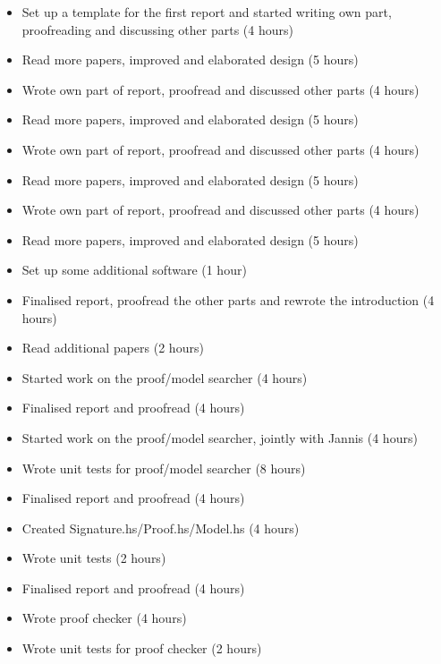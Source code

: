 %
{ \begin{itemize} 
    \item Set up a template for the first report and started writing own part,
proofreading and discussing other parts (4 hours)
    \item Read more papers, improved and elaborated design (5 hours)
 \end{itemize} 
}%
{ \begin{itemize} 
    \item Wrote own part of report, proofread and discussed other parts (4 hours)
    \item Read more papers, improved and elaborated design (5 hours)
 \end{itemize} 
}%
{ \begin{itemize} 
    \item Wrote own part of report, proofread and discussed other parts (4 hours)
    \item Read more papers, improved and elaborated design (5 hours)
 \end{itemize} 
}%
{ \begin{itemize} 
    \item Wrote own part of report, proofread and discussed other parts (4 hours)
    \item Read more papers, improved and elaborated design (5 hours)
    \item Set up some additional software (1 hour)
 \end{itemize} 
}%

%
{ \begin{itemize} 
  \item Finalised report, proofread the other
parts and rewrote the introduction  (4 hours)
 \item Read additional papers (2 hours)
 \item Started work on the proof/model searcher (4 hours)
 \end{itemize} 
}%
{ \begin{itemize} 
 \item Finalised report and proofread (4 hours)
 \item Started work on the proof/model searcher, jointly with Jannis (4 hours)
 \item Wrote unit tests for proof/model searcher (8 hours)
 \end{itemize} 
}%
{ \begin{itemize} 
  \item Finalised report and proofread (4 hours)
  \item Created Signature.hs/Proof.hs/Model.hs (4 hours)
  \item Wrote unit tests (2 hours)
 \end{itemize} 
}%
{ \begin{itemize} 
  \item Finalised report and proofread (4 hours)
  \item Wrote proof checker  (4 hours)
  \item Wrote unit tests for proof checker  (2 hours)
 \end{itemize} 
}%

